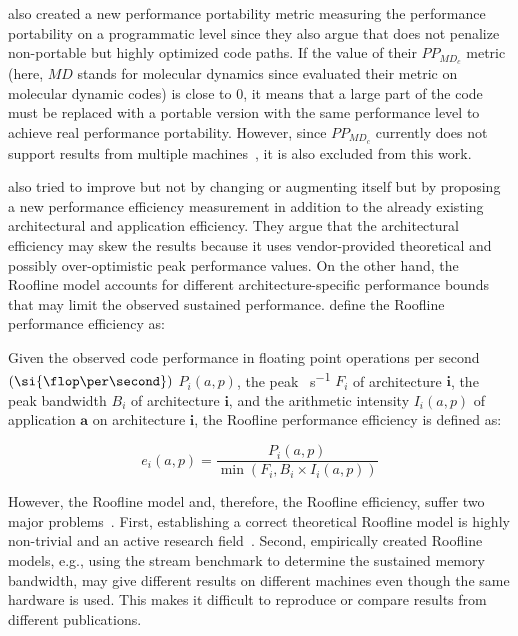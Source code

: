 \citet{sedova_high-performance_2018} also created a new performance portability metric measuring the performance portability on a programmatic level since they also argue that \pp does not penalize non-portable but highly optimized code paths. 
If the value of their $PP_{MD_c}$ metric (here, $MD$ stands for molecular dynamics since \citeauthor{sedova_high-performance_2018} evaluated their metric on molecular dynamic codes) is close to $0$, it means that a large part of the code must be replaced with a portable version with the same performance level to achieve real performance portability. 
However, since $PP_{MD_c}$ currently does not support results from multiple machines~\cite{sedova_high-performance_2018}, it is also excluded from this work. 

\citet{yang_empirical_2018} also tried to improve \pp but not by changing or augmenting \pp itself but by proposing a new performance efficiency measurement in addition to the already existing architectural and application efficiency. 
They argue that the architectural efficiency may skew the results because it uses vendor-provided theoretical and possibly over-optimistic peak performance values. 
On the other hand, the Roofline model accounts for different architecture-specific performance bounds that may limit the observed sustained performance. 
\citeauthor{yang_empirical_2018} define the Roofline performance efficiency as: 
\begin{definition}\label{def:roof_eff}
Given the observed code performance in floating point operations per second $\left(\si{\flop\per\second}\right)$ $P_i(a, p)$, the peak \si{\flop\per\second} $F_i$ of architecture $\mathbf{i}$, the peak bandwidth $B_i$ of architecture $\mathbf{i}$, and the arithmetic intensity $I_i(a, p)$ of application $\mathbf{a}$ on architecture $\mathbf{i}$, the Roofline performance efficiency is defined as:

$$e_i(a, p) = \frac{P_i(a, p)}{\min(F_i, B_i \times I_i(a, p))}$$
\end{definition}
However, the Roofline model and, therefore, the Roofline efficiency, suffer two major problems~\cite{bertoni_performance_2020, marowka_reformulation_2022}. 
First, establishing a correct theoretical Roofline model is highly non-trivial and an active research field~\cite{williams_roofline_2009, ilic_cache-aware_2014, yokota_novel_2018, taufer_applying_2016, hsu_performance_2018, grete_k-athena_2021, naraparaju_shifting_2024, antepara_performance_2024}. 
Second, empirically created Roofline models, e.g., using the stream benchmark to determine the sustained memory bandwidth, may give different results on different machines even though the same hardware is used. 
This makes it difficult to reproduce or compare results from different publications. 

